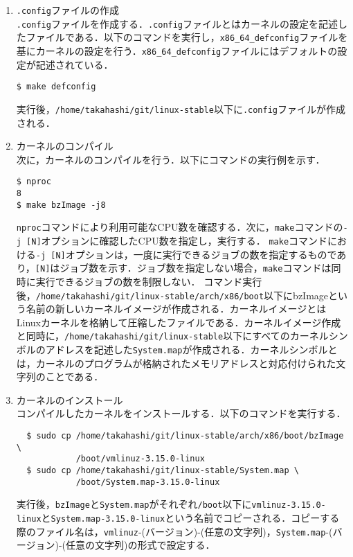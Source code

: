 \documentclass[12pt]{jsarticle}
\begin{document}
\begin{enumerate}
\item \verb|.config|ファイルの作成 \\
\verb|.config|ファイルを作成する．\verb|.config|ファイルとはカーネルの設定を記述したファイルである．以下のコマンドを実行し，\verb|x86_64_defconfig|ファイルを基にカーネルの設定を行う．\verb|x86_64_defconfig|ファイルにはデフォルトの設定が記述されている．

\begin{verbatim}
$ make defconfig
\end{verbatim}
実行後，\verb|/home/takahashi/git/linux-stable|以下に\verb|.config|ファイルが作成される．

\item カーネルのコンパイル \\
次に，カーネルのコンパイルを行う．以下にコマンドの実行例を示す．

\begin{verbatim}
$ nproc
8
$ make bzImage -j8
\end{verbatim}
\verb|nproc|コマンドにより利用可能なCPU数を確認する．次に，\verb|make|コマンドの\verb|-j [N]|オプションに確認したCPU数を指定し，実行する．
\verb|make|コマンドにおける\verb|-j [N]|オプションは，一度に実行できるジョブの数を指定するものであり，\verb|[N]|はジョブ数を示す．ジョブ数を指定しない場合，\verb|make|コマンドは同時に実行できるジョブの数を制限しない．
コマンド実行後，\verb|/home/takahashi/git/linux-stable/arch/x86/boot|以下にbzImageという名前の新しいカーネルイメージが作成される．カーネルイメージとはLinuxカーネルを格納して圧縮したファイルである．カーネルイメージ作成と同時に，\verb|/home/takahashi/git/linux-stable|以下にすべてのカーネルシンボルのアドレスを記述した\verb|System.map|が作成される．カーネルシンボルとは，カーネルのプログラムが格納されたメモリアドレスと対応付けられた文字列のことである．

\item カーネルのインストール \\
  コンパイルしたカーネルをインストールする．以下のコマンドを実行する．
\begin{verbatim}
  $ sudo cp /home/takahashi/git/linux-stable/arch/x86/boot/bzImage \
            /boot/vmlinuz-3.15.0-linux
  $ sudo cp /home/takahashi/git/linux-stable/System.map \
            /boot/System.map-3.15.0-linux
\end{verbatim}
実行後，\verb|bzImage|と\verb|System.map|がそれぞれ\verb|/boot|以下に\verb|vmlinuz-3.15.0-linux|と\verb|System.map-3.15.0-linux|という名前でコピーされる．コピーする際のファイル名は，\verb|vmlinuz|-(バージョン)-(任意の文字列)，\verb|System.map|-(バージョン)-(任意の文字列)の形式で設定する．


\end{enumerate}
\end{document}
